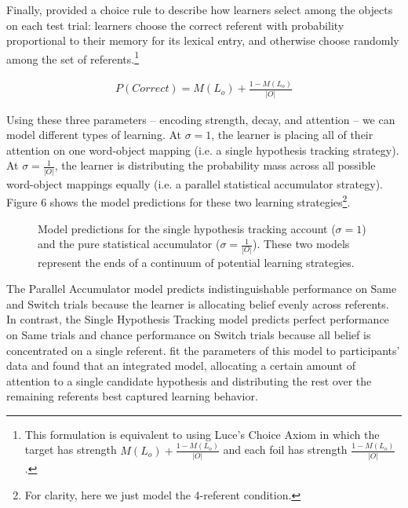 \documentclass[man]{apa2}
\begin{document}
Finally,  provided a choice rule to describe how learners select among the objects on each test trial: learners choose the correct referent with probability proportional to their memory for its lexical entry, and otherwise choose randomly among the set of referents.\footnote{This formulation is equivalent to using Luce's Choice Axiom \cite{luce1959individual} in which the target has strength  $M(L_{o}) + \frac{1-M(L_{o})}{|O|}$ and each foil has strength $\frac{1-M(L_{o})}{|O|}$.} 

\begin{align}
P(Correct) = M(L_{o}) + \frac{1-M(L_{o})}{|O|}
\end{align}

Using these three parameters -- encoding strength, decay, and attention -- we can model different types of learning.  At $\sigma = 1$, the learner is placing all of their attention on one word-object mapping (i.e. a single hypothesis tracking strategy). At $\sigma = \frac{1}{|O|}$, the learner is distributing the probability mass across all possible word-object mappings equally (i.e. a parallel statistical accumulator strategy). Figure 6 shows the model predictions for these two learning strategies\footnote{For clarity, here we just model the 4-referent condition.}. 

%
\begin{figure}[H]
	\centering
	\caption{Model predictions for the single hypothesis tracking account ($\sigma=1$) and the pure statistical accumulator ($\sigma=\frac{1}{|O|}$). These two models represent the ends of a continuum of potential learning strategies.}
\end{figure}
%

The Parallel Accumulator model predicts indistinguishable performance on Same and Switch trials because the learner is allocating belief evenly across referents. In contrast, the Single Hypothesis Tracking model predicts perfect performance on Same trials and chance performance on Switch trials because all belief is concentrated on a single referent.  fit the parameters of this model to participants' data and found that an integrated model, allocating a certain amount of attention to a single candidate hypothesis and distributing the rest over the remaining referents best captured learning behavior.  
\end{document}
